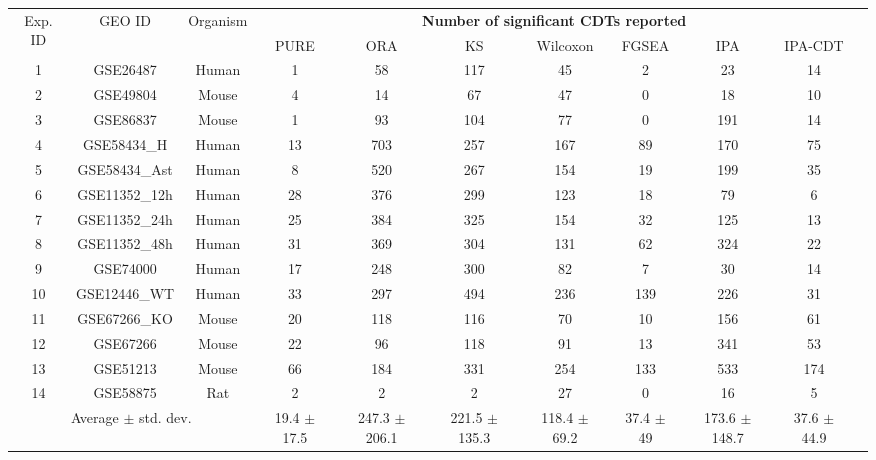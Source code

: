 \documentclass[Minh_PhD_thesis.tex]{subfiles}
\begin{document}
\begin{table}
\begin{center}
\begin{tabular}{ ccc|cccccccc }
\multirow{2}{*}{Exp. ID}& \multirow{2}{*}{GEO ID}& \multirow{2}{*}{Organism}& \multicolumn{7}{c}{\textbf{Number of significant CDTs reported}} \\
& & &   PURE  & ORA & KS  & Wilcoxon & FGSEA & IPA & IPA-CDT\\
\hline
1	& GSE26487& Human &	\cellcolor{green}1	&	58	&	117	&	45	&	\cellcolor{red}2	& 23 &	\cellcolor{cyan}14\\
2	& GSE49804& Mouse	&	\cellcolor{green}4	&	\cellcolor{cyan}14	&	67	&	47	&	\cellcolor{red}0	&	\cellcolor{cyan}18 & \cellcolor{cyan}10\\
3	& GSE86837& Mouse	&	\cellcolor{green}1	&	93	&	104	&	77	&	\cellcolor{red}0	& \cellcolor{red}191 &	\cellcolor{red}14\\
4	& GSE58434\_H& Human &		\cellcolor{cyan}13	&	703	&	257	&	167	&	\cellcolor{red}89 &	170 &	75\\
5	& GSE58434\_Ast& Human &	\cellcolor{green}8	&	520	&	267	&	\cellcolor{red}154	&	\cellcolor{red}19	& 199 &	35\\
6	& GSE11352\_12h & Human	&	28	&	376	&	299	&	\cellcolor{red}123	&	\cellcolor{cyan}18	& 79&	\cellcolor{green}6\\
7	& GSE11352\_24h & Human	&	25	&	384	&	325	&	\cellcolor{red}154	&	32	&125 &	\cellcolor{cyan}13\\
8	& GSE11352\_48h & Human	&	31	&	369	&	304	&	\cellcolor{red}131	&	62	&324 & 	22\\
9	& GSE74000 & Human	&	\cellcolor{cyan}17	&	248	&	300	&	82	&	\cellcolor{red}7	&	\cellcolor{red}30 & \cellcolor{red}14\\
10	& GSE12446\_WT & Human	&	33	&	297	&	494	&	\cellcolor{red}236	&	139	&	226 & 31\\
11	& GSE67266\_KO	& Mouse	&	\cellcolor{cyan}20	&	118	&	116	&	70	&	\cellcolor{cyan}10	&	156& 61\\
12	& GSE67266&	Mouse	&	22	&	96	&	118	&	91	&	\cellcolor{cyan}13	& 341&	53\\
13	& GSE51213	& Mouse	&	66	&	184	&	331	&	254	&	133	&	533& 174\\
14	& GSE58875	& Rat 	&	\cellcolor{green}2	&	\cellcolor{green}2	&	\cellcolor{green}2	&	27	&	\cellcolor{red}0	&\cellcolor{red}16&	\cellcolor{red}5\\
\hline
\multicolumn{3}{c}{Average $\pm$ std. dev. }& \makecell{19.4 \\$\pm$ 17.5 } & \makecell{247.3 \\$\pm$ 206.1} & \makecell{221.5 \\$\pm$ 135.3} & \makecell{118.4 \\$\pm$  69.2} & \makecell{37.4 \\$\pm$ 49} & \makecell{173.6 \\$\pm$ 148.7} & \makecell{37.6 \\$\pm$ 44.9} \\ \hline \hline
 
\end{tabular}
\end{center}
\end{table}
\end{document}
